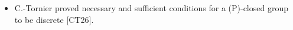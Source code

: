 \documentclass[preview]{standalone}
\begin{document}
\begin{center}
\begin{itemize} \item C.-Tornier proved necessary and sufficient conditions for a (P)-closed group to be discrete [CT26].\end{itemize}
\end{center}
\end{document}
